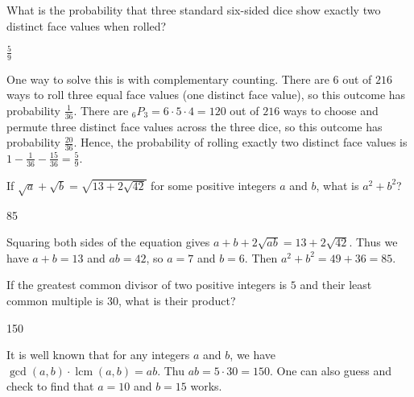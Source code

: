 \documentclass[11pt]{article}
\begin{document}
\begin{problem}%
What is the probability that three standard six-sided dice  show exactly two distinct face values when rolled?
\end{problem}

\begin{answer}
$\frac{5}{9}$
\end{answer}

\begin{solution}
One way to solve this is with complementary counting. There are $6$ out of $216$ ways to roll three equal face values (one distinct face value), so this outcome has probability $\frac{1}{36}$. There are $_6P_3 = 6 \cdot 5 \cdot 4 = 120$ out of $216$ ways to choose and permute three distinct face values across the three dice, so this outcome has probability $\frac{20}{36}$. Hence, the probability of rolling exactly two distinct face values is $1 - \frac{1}{36} - \frac{15}{36} = \frac{5}{9}$.
\end{solution}


\begin{problem}%
If $\sqrt{a}+\sqrt{b} = \sqrt{13+2\sqrt{42}}$ for some positive integers $a$ and $b$, what is $a^2+b^2$?
\end{problem}

\begin{answer}
85
\end{answer}

\begin{solution}
Squaring both sides of the equation gives $a + b + 2\sqrt{ab} = 13 + 2\sqrt{42}$. Thus we have $a+b = 13$ and $ab = 42$, so $a = 7$ and $b = 6$. Then $a^2 + b^2 = 49 + 36 = 85$.
\end{solution}

\begin{problem}
If the greatest common divisor of two positive integers is $5$ and their least common multiple is $30$, what is their product?
\end{problem}

\begin{answer}
150
\end{answer}

\begin{solution}
It is well known that for any integers $a$ and $b$, we have $\gcd(a ,b) \cdot \operatorname{lcm}(a, b) = ab$. Thu $ab = 5 \cdot 30 = 150$. One can also guess and check to find that $a = 10$ and $b = 15$ works.
\end{solution}
\end{document}
